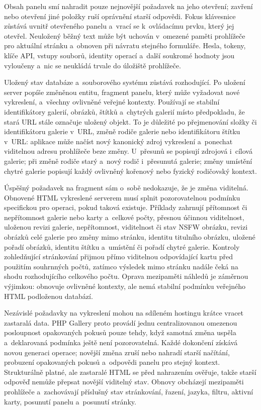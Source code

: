 \documentclass[11pt,a4paper]{article}
\begin{document}
Obsah panelu smí nahradit pouze nejnovější požadavek na jeho otevření; zavření
nebo otevření jiné položky ruší oprávnění starší odpovědi. Fokus klávesnice
zůstává uvnitř otevřeného panelu a~vrací se k~ovládacímu prvku, který jej
otevřel. Neuložený běžný text může být uchován v~omezené paměti prohlížeče pro
aktuální stránku a~obnoven při návratu stejného formuláře. Hesla, tokeny, klíče
API, vstupy souborů, identity operací a~další soukromé hodnoty jsou vyloučeny
a~nic se neukládá trvale do úložiště prohlížeče.

Uložený stav databáze a~souborového systému zůstává rozhodující. Po uložení
server popíše změněnou entitu, fragment panelu, který může vyžadovat nové
vykreslení, a~všechny ovlivněné veřejné kontexty. Používají se stabilní
identifikátory galerií, obrázků, štítků a~chytrých galerií místo předpokladu, že
stará URL stále označuje uložený objekt. To je důležité po přejmenování složky
či identifikátoru galerie v~URL, změně rodiče galerie nebo identifikátoru štítku
v~URL: aplikace může načíst nový kanonický zdroj vykreslení a~ponechat
viditelnou adresu prohlížeče beze změny. U~přesunů se popisují zdrojová i~cílová
galerie; při změně rodiče starý a~nový rodič i~přesunutá galerie; změny umístění
chytré galerie popisují každý ovlivněný kořenový nebo fyzický rodičovský
kontext.

Úspěšný požadavek na fragment sám o~sobě nedokazuje, že je změna viditelná.
Obnovené HTML vykreslené serverem musí splnit pozorovatelnou podmínku
specifickou pro operaci, pokud taková existuje. Příklady zahrnují přítomnost či
nepřítomnost galerie nebo karty a~celkové počty, přesnou účinnou viditelnost,
uloženou revizi galerie, nepřítomnost, viditelnost či stav NSFW obrázku, revizi
obrázků celé galerie pro změny mimo stránku, identitu titulního obrázku, uložené
pořadí obrázků, identitu štítku a~umístění či pořadí chytré galerie. Kontroly
zohledňující stránkování přijmou přímo viditelnou odpovídající kartu před
použitím souhrnných počtů, zatímco výsledek mimo stránku nadále čeká na shodu
rozhodujícího celkového počtu. Oprava mezipaměti náhledů je záměrnou výjimkou:
obnovuje ovlivněné kontexty, ale nemá stabilní podmínku veřejného HTML
podloženou databází.

Nezávislé požadavky na vykreslení mohou na sdíleném hostingu krátce vracet
zastaralá data. PHP Gallery proto provádí jednu centralizovanou omezenou
posloupnost opakovaných pokusů pouze tehdy, když samotná změna uspěla
a~deklarovaná podmínka ještě není pozorovatelná. Každé dokončení získává novou
generaci operace; novější změna zruší nebo nahradí starší načítání, probuzení
opakovaných pokusů a~odpovědi panelu pro stejný kontext. Strukturálně platné,
ale zastaralé HTML se před nahrazením ověřuje, takže starší odpověď nemůže
přepsat novější viditelný stav. Obnovy obcházejí mezipaměti prohlížeče
a~zachovávají příslušný stav stránkování, řazení, jazyka, filtru, aktivní karty,
posunutí panelu a~posunutí stránky.
\end{document}
